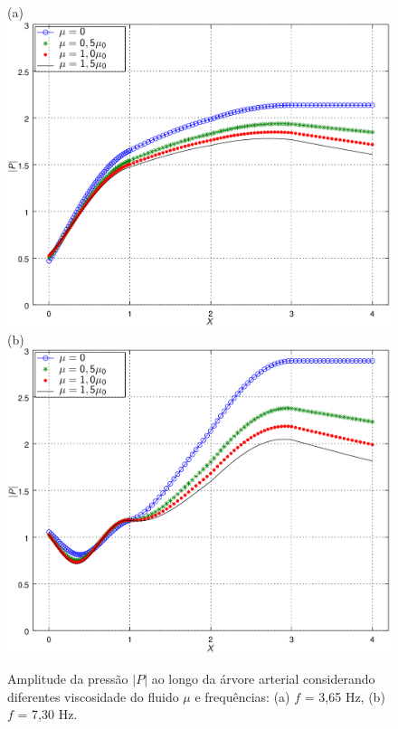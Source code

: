 \documentclass[
        english,			
        brazil			        %
        ,<...>]{abntbibufjf}
\begin{document}
\begin{figure}[!htbp]
	\centering
	(a) \\
		\includegraphics[scale=0.7]{figure3-result-new/fig3_P_f3_65_visc_new2.png}\\
	(b)\\
	\includegraphics[scale=0.7]{figure3-result-new/fig3_P_f7_30_visc_new2.png}\\
	\caption{Amplitude da pressão $|P|$ ao longo da árvore arterial considerando diferentes viscosidade do fluido $\mu$ e frequências: (a) $f$ = 3,65 Hz, (b)  $f$ = 7,30 Hz. }
	\label{fig3a:arterial-tree}%
\end{figure}
\end{document}
